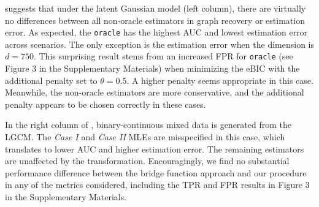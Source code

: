  suggests that under the latent Gaussian model (left column), there are virtually no differences between all non-oracle estimators in graph recovery or estimation error. As expected, the \texttt{oracle} has the highest AUC and lowest estimation error across scenarios. The only exception is the estimation error when the dimension is \(d = 750\). This surprising result stems from an increased FPR for \texttt{oracle} (see Figure 3 in the Supplementary Materials) when minimizing the eBIC with the additional penalty set to $\theta = 0.5$. A higher penalty seems appropriate in this case. Meanwhile, the non-oracle estimators are more conservative, and the additional penalty appears to be chosen correctly in these cases.

In the right column of , binary-continuous mixed data is generated from the LGCM. The \textit{Case I} and \textit{Case II} MLEs are misspecified in this case, which translates to lower AUC and higher estimation error.
The remaining estimators are unaffected by the transformation. Encouragingly, we find no substantial performance difference between the bridge function approach and our procedure in any of the metrics considered, including the TPR and FPR results in Figure 3 in the Supplementary Materials.

